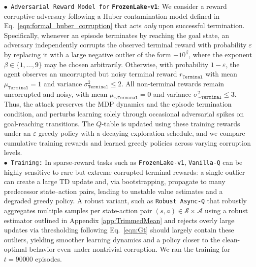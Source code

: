 \documentclass{article}
\newcommand{\mc}{\mathcal}
\begin{document}
\(\bullet\)~\textcolor{winered}{\texttt{Adversarial Reward Model for} \textbf{ \texttt{FrozenLake-v1}}:} We consider a reward corruptive adversary following a Huber contamination model defined in Eq.~\eqref{eqn:formal_huber_corruption} that acts \emph{only} upon successful termination. Specifically, whenever an episode terminates by reaching the goal state, an adversary independently corrupts the observed terminal reward with probability $\varepsilon$ by replacing it with a large negative outlier of the form $-10^{\beta}$, where the exponent $\beta \in \{1,\dots,9\}$ may be chosen arbitrarily. Otherwise, with probability $1-\varepsilon$, the agent observes an uncorrupted but noisy terminal reward \(r_{\texttt{Terminal}}\) with mean $\mu_{\texttt{Terminal}}=1$ and variance $\sigma_{\texttt{Terminal}}^2 \le 2$. All non-terminal rewards remain uncorrupted and noisy, with mean $\mu_{\sim \texttt{Terminal}}=0$ and variance $\sigma_{\sim \texttt{Terminal}}^2 \le 3$. Thus, the attack preserves the MDP dynamics and the episode termination condition, and perturbs learning solely through occasional adversarial spikes on goal-reaching transitions. The \(Q\)-table is updated using these training rewards under an $\varepsilon$-greedy policy with a decaying exploration schedule, and we compare cumulative training rewards and learned greedy policies across varying corruption levels.\\[1 mm]
\(\bullet\)~\textcolor{winered}{\texttt{Training:}} In sparse-reward tasks such as \textcolor{winered}{\texttt{FrozenLake-v1}}, \texttt{Vanilla-Q} can be highly sensitive to rare but extreme corrupted terminal rewards: a single outlier can create a large TD update and, via bootstrapping, propagate to many predecessor state--action pairs, leading to unstable value estimates and a degraded greedy policy. A robust variant, such as \textcolor{mygreen}{\texttt{Robust Async-Q}} that robustly aggregates multiple samples per state-action pair $(s,a) \in \mc{S}\times\mc{A}$ using a robust estimator outlined in Appendix \ref{app:TrimmedMean} and rejects overly large updates via thresholding following Eq.~\ref{eqn:Gt} should largely contain these outliers, yielding smoother learning dynamics and a policy closer to the clean-optimal behavior even under nontrivial corruption. We ran the training for \(t=90000\) episodes.
\end{document}
